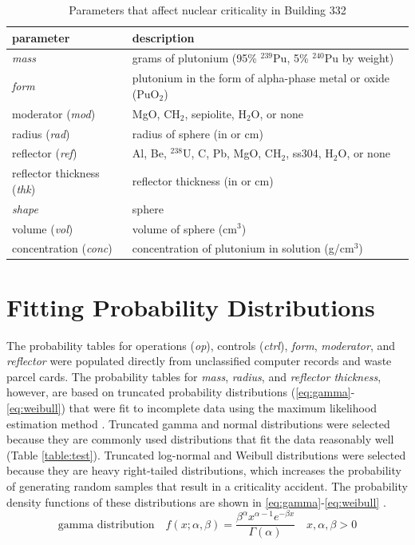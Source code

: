 \begin{table}
  \caption{Parameters that affect nuclear criticality in Building 332}
  \label{table:param}
  \renewcommand\arraystretch{1.5}
  \begin{center}
    \begin{tabular}{|l l|}
      \hline
      parameter                          & description \\
      \hline
      \textit{mass}                      & grams of plutonium (95\% $^{239}$Pu, 5\% $^{240}$Pu by weight) \\
      \textit{form}                      & plutonium in the form of alpha-phase metal or oxide (PuO$_{2}$) \\
      moderator (\textit{mod})           & MgO, CH$_{2}$, sepiolite, H$_{2}$O, or none \\
      radius (\textit{rad})              & radius of sphere (in or cm) \\
      reflector (\textit{ref})           & Al, Be, $^{238}$U, C, Pb, MgO, CH$_{2}$, \gls{ss304}, H$_{2}$O, or none \\
      reflector thickness (\textit{thk}) & reflector thickness (in or cm) \\
      \textit{shape}                     & sphere \\
      volume (\textit{vol})              & volume of sphere (cm$^{3}$) \\
      concentration (\textit{conc})      & concentration of plutonium in solution (g/cm$^{3}$) \\
      \hline
    \end{tabular}
  \end{center}
\end{table}

\section{Fitting Probability Distributions}

The probability tables for operations (\textit{op}), controls (\textit{ctrl}), \textit{form}, \textit{moderator}, and \textit{reflector} were populated directly from unclassified computer records and waste parcel cards.
The probability tables for \textit{mass}, \textit{radius}, and \textit{reflector thickness}, however, are based on truncated probability distributions (\ref{eq:gamma}-\ref{eq:weibull}) that were fit to incomplete data using the maximum likelihood estimation method \cite{d'agostino}.
Truncated gamma and normal distributions were selected because they are commonly used distributions that fit the data reasonably well (Table \ref{table:test}).
Truncated log-normal and Weibull distributions were selected because they are heavy right-tailed distributions, which increases the probability of generating random samples that result in a criticality accident.
The probability density functions of these distributions are shown in \ref{eq:gamma}-\ref{eq:weibull} \cite{devore}.
%
\begin{equation}
  \label{eq:gamma}
    \mbox{gamma distribution} \quad f(x; \alpha, \beta) = \frac{\beta^{\alpha}x^{\alpha - 1}e^{-\beta x}}{\Gamma(\alpha)} \quad x, \alpha, \beta > 0
\end{equation}

